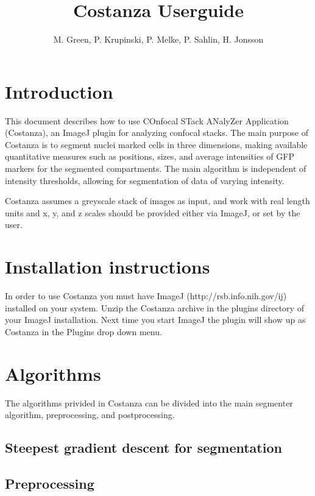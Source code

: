 \documentclass[a4paper,12pt]{article}
\title{Costanza Userguide}
\author{M. Green, P. Krupinski, P. Melke, P. Sahlin, H. Jonsson}
\begin{document}
\maketitle


\section{Introduction}

This document describes how to use COnfocal STack ANalyZer Application
(Costanza), an ImageJ\cite{Abramoff2004} plugin for analyzing confocal
stacks. The main purpose of Costanza is to segment nuclei marked cells
in three dimensions, making available quantitative measures such as
positions, sizes, and average intensities of GFP markers for the
segmented compartments. The main algorithm is independent of intensity
thresholds, allowing for segmentation of data of varying intensity.

Costanza assumes a greyscale stack of images as input, and work with
real length units and x, y, and z scales should be provided either via
ImageJ, or set by the user.

\section{Installation instructions}

In order to use Costanza you must have ImageJ
(http://rsb.info.nih.gov/ij) installed on your system. Unzip the
Costanza archive in the plugins directory of your ImageJ installation. Next
time you start ImageJ the plugin will show up as Costanza in the Plugins drop
down menu.

\section{Algorithms}

The algorithms privided in Costanza can be divided into the main
segmenter algorithm, preprocessing, and postprocessing.

\subsection{Steepest gradient descent for segmentation}



\subsection{Preprocessing}
\end{document}

